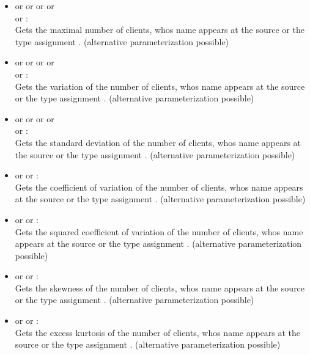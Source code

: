 \begin{itemize}
\item
{} or  or  or  or\\
 or :\\
Gets the maximal number of clients, whos name appears at the source or the type assignment .
(alternative parameterization possible)

\item
{} or  or  or  or\\
 or :\\
Gets the variation of the number of clients, whos name appears at the source or the type assignment .
(alternative parameterization possible)

\item
{} or  or  or  or\\
 or :\\
Gets the standard deviation of the number of clients, whos name appears at the source or the type assignment .
(alternative parameterization possible)

\item
{} or  or :\\
Gets the coefficient of variation of the number of clients, whos name appears at the source or the type assignment .
(alternative parameterization possible)

\item
{} or  or :\\
Gets the squared coefficient of variation of the number of clients, whos name appears at the source or the type assignment .
(alternative parameterization possible)

\item
{} or  or :\\
Gets the skewness of the number of clients, whos name appears at the source or the type assignment .
(alternative parameterization possible)

\item
{} or  or :\\
Gets the excess kurtosis of the number of clients, whos name appears at the source or the type assignment .
(alternative parameterization possible)


\end{itemize}
